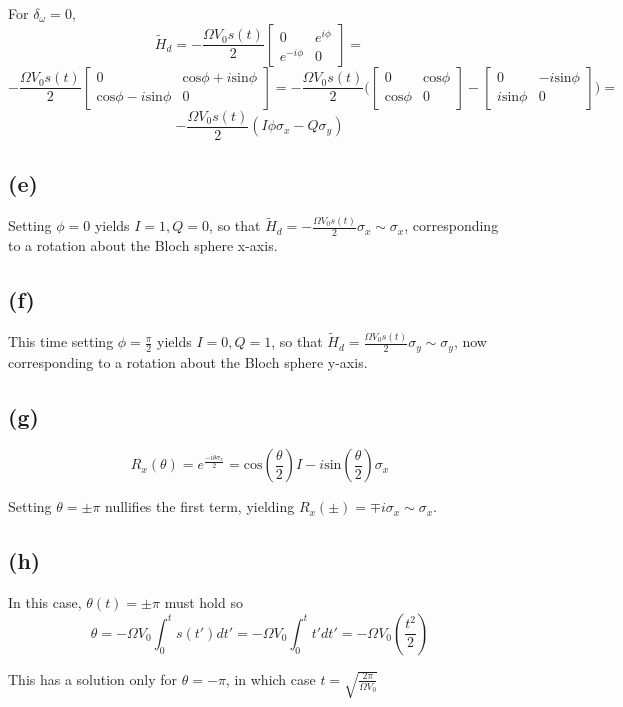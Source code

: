 \documentclass{article}
\begin{document}
For $\delta_\omega=0$, 
$$
\tilde{H}_d=
-\frac{\Omega V_0s(t)}{2}
\begin{bmatrix}
0 & e^{i\phi} \\
e^{-i\phi} & 0
\end{bmatrix}=
$$
$$
-\frac{\Omega V_0s(t)}{2}
\begin{bmatrix}
0 & \text{cos}\phi+i\text{sin}\phi \\
\text{cos}\phi-i\text{sin}\phi & 0
\end{bmatrix}=
-\frac{\Omega V_0s(t)}{2}\biggl(
\begin{bmatrix}
0 & \text{cos}\phi \\
\text{cos}\phi & 0
\end{bmatrix}
-\begin{bmatrix}
0 & -i\text{sin}\phi \\
i\text{sin}\phi & 0
\end{bmatrix}\biggr)=
$$
$$
\boxed{-\frac{\Omega V_0s(t)}{2}\left(I\phi\sigma_x-Q\sigma_y\right)}
$$

\subsection{(e)}

Setting $\phi=0$ yields $I=1, Q=0$, so that $\tilde{H}_d=-\frac{\Omega V_0s(t)}{2}\sigma_x\sim\sigma_x$, corresponding to a rotation about the Bloch sphere x-axis.

\subsection{(f)}

This time setting $\phi=\frac{\pi}{2}$ yields $I=0, Q=1$, so that $\tilde{H}_d=\frac{\Omega V_0s(t)}{2}\sigma_y\sim\sigma_y$, now corresponding to a rotation about the Bloch sphere y-axis.

\subsection{(g)}
$$
R_x(\theta)=e^\frac{-i\theta\sigma_x}{2}=\text{cos}(\frac{\theta}{2})I-i\text{sin}(\frac{\theta}{2})\sigma_x
$$

Setting $\boxed{\theta=\pm\pi}$ nullifies the first term, yielding $
R_x(\pm)=\mp i\sigma_x\sim\sigma_x$.

\subsection{(h)}

In this case, $\theta(t)=\pm\pi$ must hold so
$$
\theta=-\Omega V_0\int_0^t s(t')dt'=-\Omega V_0\int_0^t t'dt'=-\Omega V_0\left(\frac{t^2}{2}\right)
$$

This has a solution only for $\theta=-\pi$, in which case $t=\boxed{\sqrt{\frac{2\pi}{\Omega V_0}}}$
\end{document}
